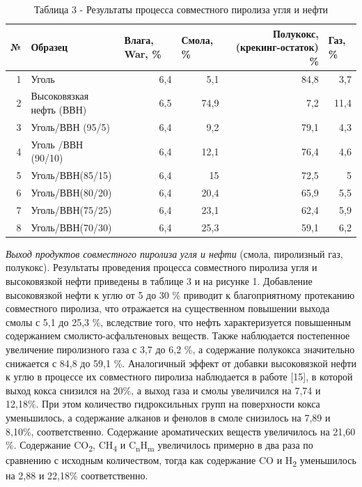 \begin{table}[H]
\caption*{Таблица 3 - Результаты процесса совместного пиролиза угля и
нефти}
\centering
\begin{tabular}{|r|l|r|r|r|r|}
\hline
\multicolumn{1}{|l|}{№} &
  Образец &
  \multicolumn{1}{l|}{Влага, War, \%} &
  \multicolumn{1}{l|}{Смола, \%} &
  \multicolumn{1}{p{0.21\textwidth}|}{Полукокс, (крекинг-остаток) \%} &
  \multicolumn{1}{l|}{Газ, \%} \\ \hline
1 & Уголь                    & 6,4 & 5,1  & 84,8 & 3,7  \\ \hline
2 & Высоковязкая нефть (ВВН) & 6,5 & 74,9 & 7,2  & 11,4 \\ \hline
3 & Уголь/ВВН (95/5)         & 6,4 & 9,2  & 79,1 & 4,3  \\ \hline
4 & Уголь /ВВН (90/10)       & 6,4 & 12,1 & 76,4 & 4,6  \\ \hline
5 & Уголь/ВВН(85/15)         & 6,4 & 15   & 72,5 & 5    \\ \hline
6 & Уголь/ВВН(80/20)         & 6,4 & 20,4 & 65,9 & 5,5  \\ \hline
7 & Уголь/ВВН(75/25)         & 6,4 & 23,1 & 62,4 & 5,9  \\ \hline
8 & Уголь/ВВН(70/30)         & 6,4 & 25,3 & 59,1 & 6,2  \\ \hline
\end{tabular}
\end{table}

\begin{multicols}{2}
\emph{Выход продуктов совместного пиролиза} \emph{угля и нефти} (смола,
пиролизный газ, полукокс). Результаты проведения процесса совместного
пиролиза угля и высоковязкой нефти приведены в таблице 3 и на рисунке 1.
Добавление высоковязкой нефти к углю от 5 до 30 \% приводит к
благоприятному протеканию совместного пиролиза, что отражается на
существенном повышении выхода смолы с 5,1 до 25,3 \%, вследствие того,
что нефть характеризуется повышенным содержанием смолисто-асфальтеновых
веществ. Также наблюдается постепенное увеличение пиролизного газа с 3,7
до 6,2 \%, а содержание полукокса значительно снижается с 84,8 до 59,1
\%. Аналогичный эффект от добавки высоковязкой нефти к углю в процессе
их совместного пиролиза наблюдается в работе {[}15{]}, в которой выход
кокса снизился на 20\%, а выход газа и смолы увеличился на 7,74 и
12,18\%. При этом количество гидроксильных групп на поверхности кокса
уменьшилось, а содержание алканов и фенолов в смоле снизилось на 7,89 и
8,10\%, соответственно. Содержание ароматических веществ увеличилось на
21,60 \%. Содержание CO\textsubscript{2}, CH\textsubscript{4} и
C\textsubscript{n}H\textsubscript{m} увеличилось примерно в два раза по
сравнению с исходным количеством, тогда как содержание CO и
H\textsubscript{2} уменьшилось на 2,88 и 22,18\% соответственно.
\end{multicols}

